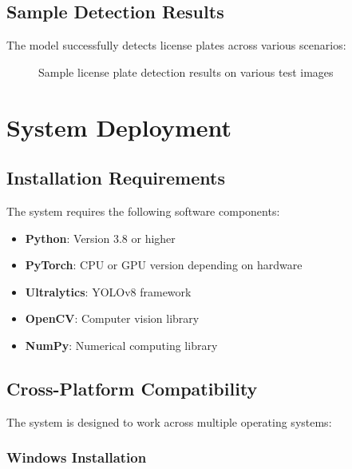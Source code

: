 \documentclass[12pt,a4paper]{article}
\begin{document}
\subsection{Sample Detection Results}

The model successfully detects license plates across various scenarios:

\begin{figure}[H]
\centering
\caption{Sample license plate detection results on various test images}
\end{figure}

\section{System Deployment}

\subsection{Installation Requirements}

The system requires the following software components:

\begin{itemize}
    \item \textbf{Python}: Version 3.8 or higher
    \item \textbf{PyTorch}: CPU or GPU version depending on hardware
    \item \textbf{Ultralytics}: YOLOv8 framework
    \item \textbf{OpenCV}: Computer vision library
    \item \textbf{NumPy}: Numerical computing library
\end{itemize}

\subsection{Cross-Platform Compatibility}

The system is designed to work across multiple operating systems:

\subsubsection{Windows Installation}
\end{document}
